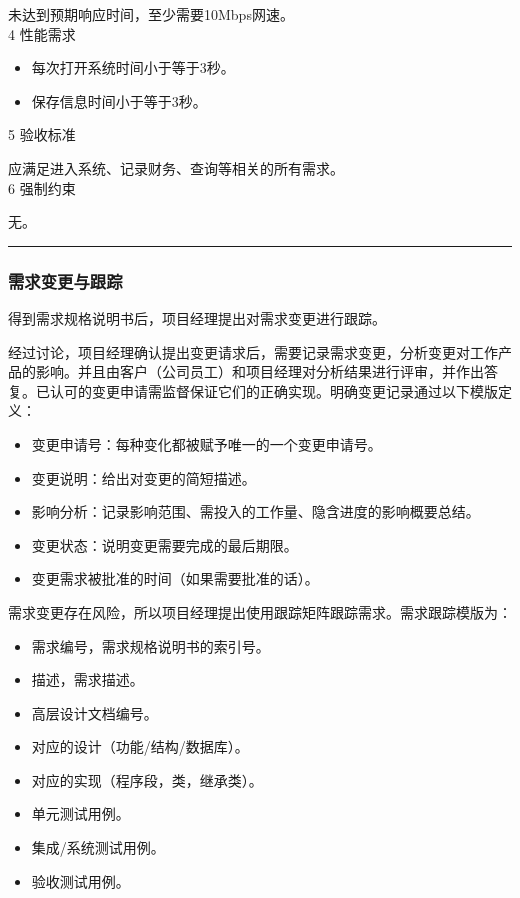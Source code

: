 \documentclass[UTF8,nofonts]{ctexart}
\begin{document}
未达到预期响应时间，至少需要10Mbps网速。\\
4 性能需求
\begin{itemize}
\setlength{\itemsep}{0pt}
\setlength{\parskip}{0pt}
\setlength{\parsep}{0pt}
	\item 每次打开系统时间小于等于3秒。
	\item 保存信息时间小于等于3秒。
\end{itemize}
5 验收标准

应满足进入系统、记录财务、查询等相关的所有需求。\\
6 强制约束

无。\\ 
\noindent\rule[0.25\baselineskip]{\textwidth}{2pt}

\subsubsection{需求变更与跟踪}
得到需求规格说明书后，项目经理提出对需求变更进行跟踪。

经过讨论，项目经理确认提出变更请求后，需要记录需求变更，分析变更对工作产品的影响。并且由客户（公司员工）和项目经理对分析结果进行评审，并作出答复。已认可的变更申请需监督保证它们的正确实现。明确变更记录通过以下模版定义：
\begin{itemize}
\setlength{\itemsep}{0pt}
\setlength{\parskip}{0pt}
\setlength{\parsep}{0pt}
	\item 变更申请号：每种变化都被赋予唯一的一个变更申请号。
	\item 变更说明：给出对变更的简短描述。
	\item 影响分析：记录影响范围、需投入的工作量、隐含进度的影响概要总结。
	\item 变更状态：说明变更需要完成的最后期限。
	\item 变更需求被批准的时间（如果需要批准的话）。
\end{itemize}

需求变更存在风险，所以项目经理提出使用跟踪矩阵跟踪需求。需求跟踪模版为：
\begin{itemize}
\setlength{\itemsep}{0pt}
\setlength{\parskip}{0pt}
\setlength{\parsep}{0pt}
	\item 需求编号，需求规格说明书的索引号。
	\item 描述，需求描述。
	\item 高层设计文档编号。
	\item 对应的设计（功能/结构/数据库）。
	\item 对应的实现（程序段，类，继承类）。
	\item 单元测试用例。
	\item 集成/系统测试用例。
	\item 验收测试用例。
\end{itemize}
\end{document}
